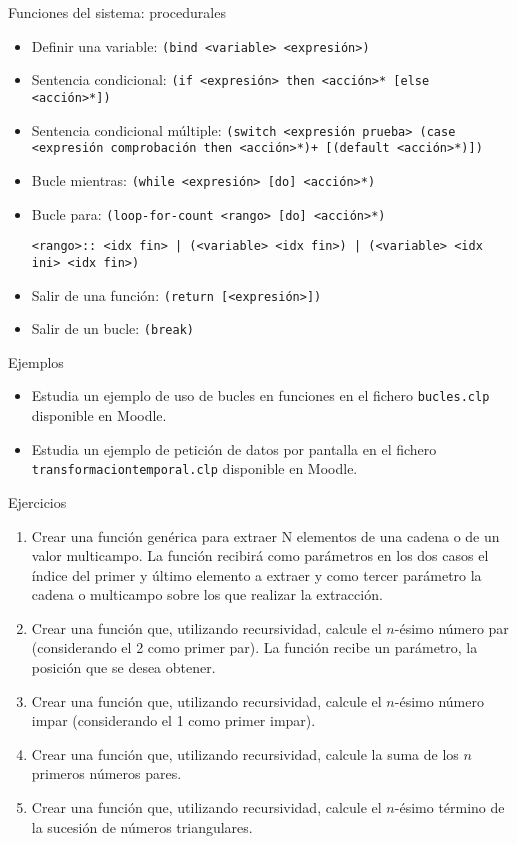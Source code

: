 \documentclass[usenames,dvipsnames,aspectratio=169]{beamer}
\begin{document}
\begin{frame}{Funciones del sistema: procedurales}
	\begin{itemize}
		\item Definir una variable: \texttt{(bind <variable> <expresión>)}
		\item Sentencia condicional: \texttt{(if <expresión> then <acción>* [else <acción>*])}
		\item Sentencia condicional múltiple: \texttt{(switch <expresión prueba> (case <expresión comprobación then <acción>*)+ [(default <acción>*)])}
		\item Bucle mientras: \texttt{(while <expresión> [do] <acción>*)}
		\item Bucle para: \texttt{(loop-for-count <rango> [do] <acción>*)}
		
		\texttt{<rango>:: <idx fin> | (<variable> <idx fin>) | (<variable> <idx ini> <idx fin>)}
		\item Salir de una función: \texttt{(return [<expresión>])}
		\item Salir de un bucle: \texttt{(break)}
	\end{itemize}
\end{frame}

\begin{frame}{Ejemplos}
	\begin{itemize}
		\item Estudia un ejemplo de uso de bucles en funciones en el fichero \texttt{bucles.clp} disponible en Moodle.
		\item Estudia un ejemplo de petición de datos por pantalla en el fichero \texttt{transformaciontemporal.clp} disponible en Moodle.
	\end{itemize}
\end{frame}

\begin{frame}{Ejercicios}
	\begin{enumerate}
		\item Crear una función genérica para extraer N elementos de una cadena o de un valor multicampo. La función recibirá como parámetros en los dos casos el índice del primer y último elemento a extraer y como tercer parámetro la cadena o multicampo sobre los que realizar la extracción.
		
		\item Crear una función que, utilizando recursividad, calcule el $n$-ésimo número par (considerando el 2 como primer par). La función recibe un parámetro, la posición que se desea obtener.
		
		\item Crear una función que, utilizando recursividad, calcule el $n$-ésimo número impar (considerando el 1 como primer impar).
		
		\item Crear una función que, utilizando recursividad, calcule la suma de los $n$ primeros números pares.
		
		\item Crear una función que, utilizando recursividad, calcule el $n$-ésimo término de la sucesión de números triangulares.
	\end{enumerate}
\end{frame}

\begin{frame}
\titlepage
\end{frame}
\end{document}
